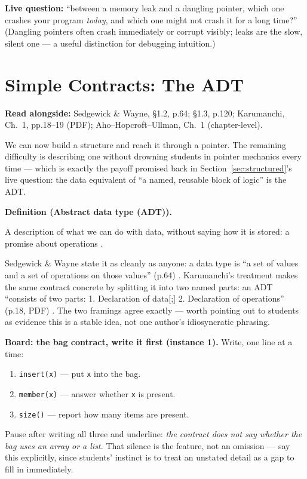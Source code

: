 \documentclass[11pt]{article}
\newenvironment{definitionbox}[1]{%
  \par\noindent\textbf{Definition (#1).}\ \itshape
}{\par\vspace{0.3em}}
\begin{document}
\textbf{Live question:} ``between a memory leak and a dangling pointer, which one crashes your program \emph{today}, and which one might not crash it for a long time?'' (Dangling pointers often crash immediately or corrupt visibly; leaks are the slow, silent one --- a useful distinction for debugging intuition.)

\section{Simple Contracts: The ADT}
\label{sec:contracts}

\textbf{Read alongside:} Sedgewick \& Wayne, \S1.2, p.64; \S1.3, p.120; Karumanchi, Ch.~1, pp.18--19 (PDF); Aho--Hopcroft--Ullman, Ch.~1 (chapter-level).

We can now build a structure and reach it through a pointer. The remaining difficulty is describing one without drowning students in pointer mechanics every time --- which is exactly the payoff promised back in Section~\ref{sec:structured}'s live question: the data equivalent of ``a named, reusable block of logic'' is the ADT.

\begin{definitionbox}{Abstract data type (ADT)}
A description of what we can do with data, without saying how it is stored: a promise about operations \cite{Sedgewick2011_algorithms}.
\end{definitionbox}

Sedgewick \& Wayne state it as cleanly as anyone: a data type is ``a set of values and a set of operations on those values'' (p.64) \cite{Sedgewick2011_algorithms}. Karumanchi's treatment makes the same contract concrete by splitting it into two named parts: an ADT ``consists of two parts: 1. Declaration of data[;] 2. Declaration of operations'' (p.18, PDF) \cite{Karumanchi2017_data_structures_algorithms_made_easy}. The two framings agree exactly --- worth pointing out to students as evidence this is a stable idea, not one author's idiosyncratic phrasing.

\textbf{Board: the bag contract, write it first (instance 1).} Write, one line at a time:
\begin{enumerate}
  \item \texttt{insert(x)} --- put \texttt{x} into the bag.
  \item \texttt{member(x)} --- answer whether \texttt{x} is present.
  \item \texttt{size()} --- report how many items are present.
\end{enumerate}
Pause after writing all three and underline: \emph{the contract does not say whether the bag uses an array or a list.} That silence is the feature, not an omission --- say this explicitly, since students' instinct is to treat an unstated detail as a gap to fill in immediately.
\end{document}
